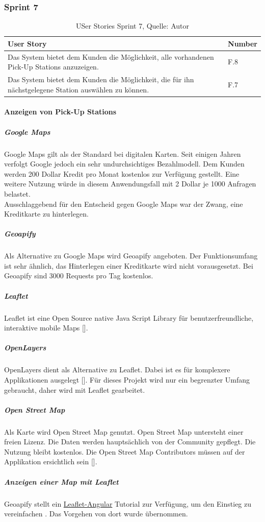 \subsubsection{Sprint 7}
\begin{table}[H]
	\setlength\extrarowheight{2pt} %
	\begin{tabularx}{\textwidth}{|X|l|}
		\hline
		\textbf{User Story} & \textbf{Number} \\
		\hline
		Das System bietet dem Kunden die Möglichkeit, alle vorhandenen Pick-Up Stations anzuzeigen. & F.8\\
		\hline
		Das System bietet dem Kunden die Möglichkeit, die für ihn nächstgelegene Station auswählen zu können. & F.7\\
		\hline
	\end{tabularx} 
	\caption[User Stories Sprint 7]{USer Stories Sprint 7, Quelle: Autor}
\end{table}\label{userStoriesSprint7}
\paragraph{Anzeigen von Pick-Up Stations}
\subparagraph{Google Maps}
Google Maps gilt als der Standard bei digitalen Karten. Seit einigen Jahren verfolgt Google jedoch ein sehr undurchsichtiges Bezahlmodell. Dem Kunden werden 200 Dollar Kredit pro Monat kostenlos zur Verfügung gestellt. Eine weitere Nutzung würde in diesem Anwendungsfall mit 2 Dollar je 1000 Anfragen belastet. \\
Ausschlaggebend für den Entscheid gegen Google Maps war der Zwang, eine Kreditkarte zu hinterlegen. 
\subparagraph{Geoapify}
Als Alternative zu Google Maps wird Geoapify angeboten. Der Funktionsumfang ist sehr ähnlich, das Hinterlegen einer Kreditkarte wird nicht vorausgesetzt. Bei Geoapify sind 3000 Requests pro Tag kostenlos. 
\subparagraph{Leaflet}
Leaflet ist eine Open Source native Java Script Library für benutzerfreundliche, interaktive mobile Maps [\cite{leaflet}]. 
\subparagraph{OpenLayers}
OpenLayers dient als Alternative zu Leaflet. Dabei ist es für komplexere Applikationen ausgelegt [\cite{leafletVsOpenlayers}]. 
Für dieses Projekt wird nur ein begrenzter Umfang gebraucht, daher wird mit Leaflet gearbeitet. 

\subparagraph{Open Street Map}
Als Karte wird Open Street Map genutzt. Open Street Map untersteht einer freien Lizenz. Die Daten werden hauptsächlich von der Community gepflegt. Die Nutzung bleibt kostenlos. Die Open Street Map Contributors müssen auf der Applikation ersichtlich sein [\cite{openStreetMap}].  
\subparagraph{Anzeigen einer Map mit Leaflet}
Geoapify stellt ein \href{https://www.geoapify.com/angular-leaflet-step-by-step-tutorial-to-add-a-map}{Leaflet-Angular} Tutorial zur Verfügung, um den Einstieg zu vereinfachen . Das Vorgehen von dort wurde übernommen. 

